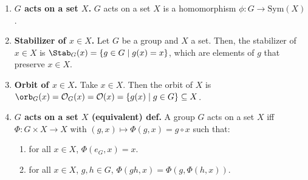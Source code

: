\begin{enumerate}
	\item \textbf{$G$ acts on a set $X$. } $G$ acts on a set $X$ is a homomorphism $\phi: G \to \textrm{Sym}(X)$. 
	\item \textbf{Stabilizer of $x \in X$. } Let $G$ be a group and $X$ a set. Then, the stabilizer of $x \in X$ is $\Stab_G(x) = \{g \in G \mid g(x)=x\}$, which are elements of $g$ that preserve $x \in X$. 
	\item \textbf{Orbit of $x \in X$. } Take $x \in X$. Then the orbit of $X$ is $\orb_G(x) = \mathcal{O}_G(x) = \mathcal{O}(x) = \{g(x) \mid g \in G\} \subseteq X$. 
	\item \textbf{$G$ acts on a set $X$ (equivalent) def. } A group $G$ acts on a set $X$ iff $\Phi: G \times X \to X$ with $(g,x) \mapsto \Phi(g,x) = g \circ x$ such that: 
	\begin{enumerate}
		\item for all $x \in X$, $\Phi(e_G,x) = x$. 
		\item for all $x \in X$, $g,h \in G$, $\Phi(gh,x) = \Phi(g,\Phi(h,x))$. 
	\end{enumerate}
\end{enumerate}



